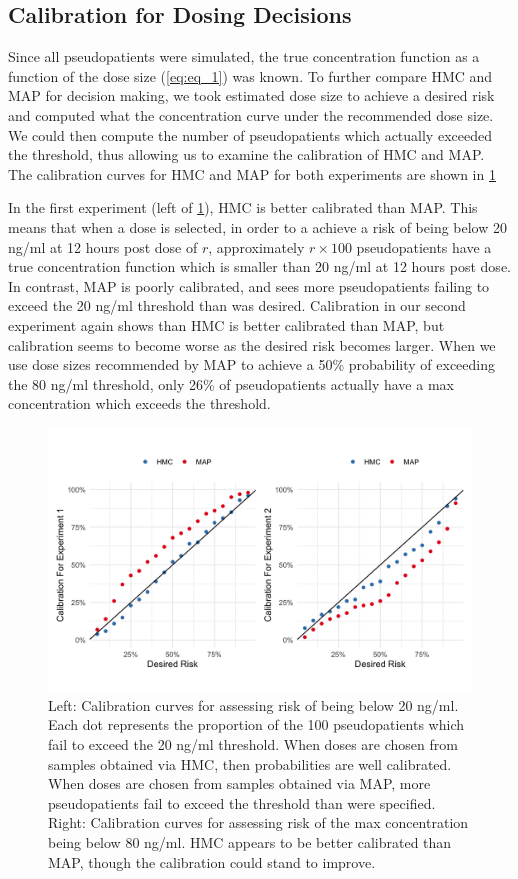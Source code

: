 \subsection*{Calibration for Dosing Decisions}

Since all pseudopatients were simulated, the true concentration function as a function of the dose size (\cref{eq:eq_1}) was known.  To further compare HMC and MAP for decision making, we took estimated dose size to achieve a desired risk and computed what the concentration curve under the recommended dose size.  We could then compute the number of pseudopatients which actually exceeded the threshold, thus allowing us to examine the calibration of HMC and MAP.  The calibration curves for HMC and MAP for both experiments are shown in \cref{fig:fig8}

In the first experiment (left of \cref{fig:fig8}), HMC is better calibrated than MAP.  This means that when a dose is selected, in order to a achieve a risk of being below 20 ng/ml at 12 hours post dose of $r$, approximately $r \times 100$ pseudopatients have a true concentration function which is smaller than 20 ng/ml at 12 hours post dose. In contrast, MAP is poorly calibrated, and sees more pseudopatients failing to exceed the 20 ng/ml threshold than was desired.  Calibration in our second experiment again shows than HMC is better calibrated than MAP, but calibration seems to become worse as the desired risk becomes larger.  When we use dose sizes recommended by MAP to achieve a 50\% probability of exceeding the 80 ng/ml threshold, only 26\% of pseudopatients actually have a max concentration which exceeds the threshold.


\begin{figure}[h!]
	\centering
	\includegraphics[width=\linewidth]{figs/fig8.png}
	\caption{Left: Calibration curves for assessing risk of being below 20 ng/ml.  Each dot represents the proportion of the 100 pseudopatients which fail to exceed the 20 ng/ml threshold.  When doses are chosen from samples obtained via HMC, then probabilities are well calibrated. When doses are chosen from samples obtained via MAP, more pseudopatients fail to exceed the threshold than were specified.  Right: Calibration curves for assessing risk of the max concentration being below 80 ng/ml. HMC appears to be better calibrated than MAP, though the calibration could stand to improve.}
	\label{fig:fig8}
\end{figure}



